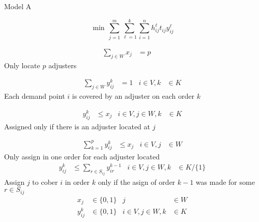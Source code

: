 \begin{frame}[allowframebreaks]{Model A}{}

{\small
  \begin{equation}
    \min \, \sum_{j=1}^{m}{\sum_{\ell=1}^{k}{\sum_{i=1}^{n}{h_{ij}^{\ell}t_{ij}y_{ij}^{\ell}}}}
  \end{equation}
}
{\footnotesize
  \begin{align}
    \sum_{j \in W}{x_j} & = p & &
  \end{align}
  Only locate $p$ adjusters  

  \begin{align}
    \sum_{j \in W}{y_{ij}^{k}} & = 1 & i \in V, k &\in K
  \end{align}
  Each demand point $i$ is covered by an adjuster on each order $k$

  \begin{align}
    y_{ij}^{k} & \leq x_j &  i \in V,j \in W, k &\in K
  \end{align}
  Assigned only if there is an adjuster located at $j$

  \begin{align}
    \sum_{k = 1}^{p}{y_{ij}^{k}} & \leq x_j & i \in V, j &\in W
  \end{align}
  Only assign in one order for each adjuster located 
  \begin{align}
    y_{ij}^{k} &\leq \sum_{r\in S_{ij}}{y_{ir}^{k-1}} &  i \in V,j \in W, k &\in K/\{1\}
  \end{align}
  Assign $j$ to cober $i$ in order $k$ only if the asign of order $k-1$ was made for some  $r \in S_{ij}$
  \begin{align}
    x_{j} & \in \{0,1\}      &                  j &\in W \nonumber\\
    y_{ij}^{k} & \in \{0,1\} &  i \in V,j \in W,k &\in K \nonumber
  \end{align}
}
\end{frame}

%
